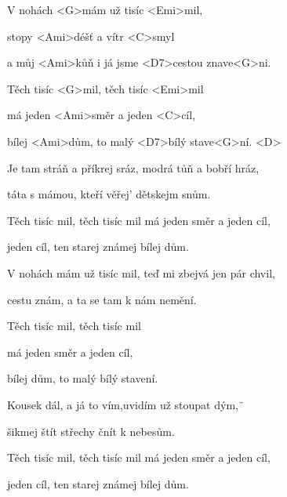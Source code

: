 

\zs
V nohách <G>mám už tisíc <Emi>mil,

stopy <Ami>déšť a vítr <C>smyl

a můj <Ami>kůň i já jsme <D7>cestou znave<G>ni.
\ks

\zr
Těch tisíc <G>mil, těch tisíc <Emi>mil

má jeden <Ami>směr a jeden <C>cíl,

bílej <Ami>dům, to malý <D7>bílý stave<G>ní. <D>
\kr

\zs
Je tam stráň a příkrej sráz, modrá tůň a bobří hráz,

táta s mámou, kteří věřej' dětskejm snům.
\ks

\zr
Těch tisíc mil, těch tisíc mil má jeden směr a jeden cíl,

jeden cíl, ten starej známej bílej dům.
\kr

\zs
V nohách mám už tisíc mil, teď mi zbejvá jen pár chvil,

cestu znám, a ta se tam k nám nemění.
\ks

\zr
Těch tisíc mil, těch tisíc mil

má jeden směr a jeden cíl,

bílej dům, to malý bílý stavení. 
\kr

\zs
Kousek dál, a já to vím,uvidím už stoupat dým,¨

šikmej štít střechy čnít k nebesům.
\ks

\zr
Těch tisíc mil, těch tisíc mil má jeden směr a jeden cíl,

jeden cíl, ten starej známej bílej dům.
\kr

\kp
